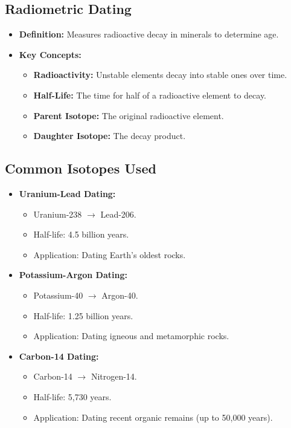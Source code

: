 \documentclass[12pt]{article}
\begin{document}
\subsection*{Radiometric Dating}
\begin{itemize}
    \item \textbf{Definition:} Measures radioactive decay in minerals to determine age.
    \item \textbf{Key Concepts:}
    \begin{itemize}
        \item \textbf{Radioactivity:} Unstable elements decay into stable ones over time.
        \item \textbf{Half-Life:} The time for half of a radioactive element to decay.
        \item \textbf{Parent Isotope:} The original radioactive element.
        \item \textbf{Daughter Isotope:} The decay product.
    \end{itemize}
\end{itemize}

\subsection*{Common Isotopes Used}
\begin{itemize}
    \item \textbf{Uranium-Lead Dating:}
    \begin{itemize}
        \item Uranium-238 $\rightarrow$ Lead-206.
        \item Half-life: 4.5 billion years.
        \item Application: Dating Earth's oldest rocks.
    \end{itemize}
    \item \textbf{Potassium-Argon Dating:}
    \begin{itemize}
        \item Potassium-40 $\rightarrow$ Argon-40.
        \item Half-life: 1.25 billion years.
        \item Application: Dating igneous and metamorphic rocks.
    \end{itemize}
    \item \textbf{Carbon-14 Dating:}
    \begin{itemize}
        \item Carbon-14 $\rightarrow$ Nitrogen-14.
        \item Half-life: 5,730 years.
        \item Application: Dating recent organic remains (up to 50,000 years).
    \end{itemize}
\end{itemize}
\end{document}

